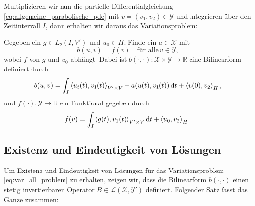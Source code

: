 Multiplizieren wir nun die partielle Differentialgleichung \eqref{eq:allgemeine_parabolische_pde} mit $v = (v_{1}, v_{2}) \in \mathcal Y$ und integrieren über den Zeitintervall $I$,  dann erhalten wir daraus das Variationsproblem:

Gegeben ein $g \in L_{2}(I, V')$ und $u_{0} \in H$. Finde ein $u \in \mathcal X$ mit
\begin{equation}
    \label{eq:var_all_problem}
    b(u, v) = f(v) \quad \text{für alle}~v \in \mathcal Y,
\end{equation}
wobei $f$ von $g$ und $u_{0}$ abhängt.
Dabei ist $b(\cdot, \cdot) \colon \mathcal X \times \mathcal Y \to \mathbb{R}$ eine Bilinearform definiert durch
\begin{equation}
    \label{eq:var_all_bf_b}
    b(u, v) = \int_{I} \left\langle u_{t}(t),v_{1}(t)\right\rangle_{V' \times V} + a(u(t), v_{1}(t)) \mathop{}\!\mathrm{d} t + \left\langle u(0),v_{2}\right\rangle_{H},
\end{equation}
und $f(\cdot) \colon \mathcal Y \to \mathbb{R}$ ein Funktional gegeben durch
\begin{equation}
    \label{eq:var_all_f}
    f(v) = \int_{I} \left\langle g(t),v_{1}(t)\right\rangle_{V' \times V} \mathop{}\!\mathrm{d} t + \left\langle u_{0},v_{2}\right\rangle_{H}.
\end{equation}


\subsection{Existenz und Eindeutigkeit von Lösungen} %
\label{sub:existenz_und_eindeutigkeit_von_l_sungen}

Um Existenz und Eindeutigkeit von Lösungen für das Variationsproblem \eqref{eq:var_all_problem} zu erhalten, zeigen wir, dass die Bilinearform $b(\cdot, \cdot)$ einen stetig invertierbaren Operator $B \in \mathcal L(\mathcal X, \mathcal Y')$ definiert.
Folgender Satz fasst das Ganze zusammen:

